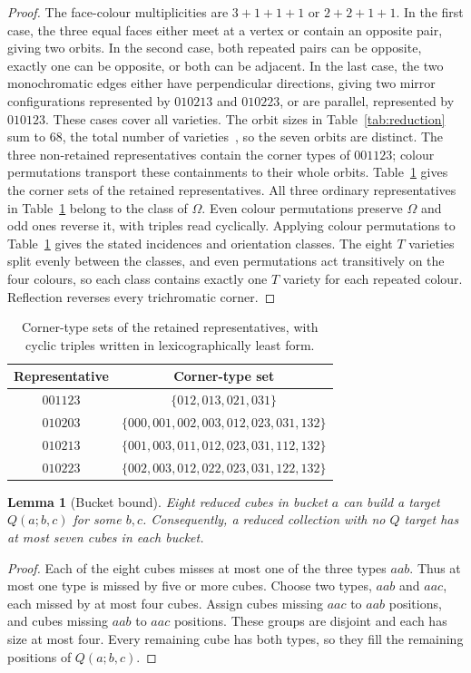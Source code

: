 \documentclass[11pt]{article}
\newtheorem{lemma}{Lemma}
\theoremstyle{remark}
\begin{document}
\begin{proof}
The face-colour multiplicities are $3+1+1+1$ or $2+2+1+1$.
In the first case, the three equal faces either meet at a vertex or contain
an opposite pair, giving two orbits. In the second case, both repeated
pairs can be opposite, exactly one can be opposite, or both can be adjacent.
In the last case, the two monochromatic edges either have perpendicular
directions, giving two mirror configurations represented by $010213$ and
$010223$, or are parallel, represented by $010123$. These cases cover all
varieties. The orbit sizes in Table~\ref{tab:reduction} sum to 68, the total
number of varieties~\cite{BES}, so the seven orbits are distinct.
The three non-retained representatives contain the corner types of $001123$;
colour permutations transport these containments to their whole orbits.
Table~\ref{tab:corners} gives the corner sets of the retained representatives.
All three ordinary representatives in Table~\ref{tab:corners} belong
to the class of $\Omega$. Even colour permutations preserve $\Omega$
and odd ones reverse it, with triples read cyclically. Applying colour
permutations to Table~\ref{tab:corners} gives the stated incidences and
orientation classes. The eight $T$ varieties split evenly between the
classes, and even permutations act transitively on the four colours, so
each class contains exactly one $T$ variety for each repeated colour.
Reflection reverses every trichromatic corner.
\end{proof}

\begin{table}[ht]
\centering
\begin{tabular}{cc}
\toprule
Representative & Corner-type set\\
\midrule
$001123$ & $\{012,013,021,031\}$\\
$010203$ & $\{000,001,002,003,012,023,031,132\}$\\
$010213$ & $\{001,003,011,012,023,031,112,132\}$\\
$010223$ & $\{002,003,012,022,023,031,122,132\}$\\
\bottomrule
\end{tabular}
\caption{Corner-type sets of the retained representatives, with cyclic
triples written in lexicographically least form.}
\label{tab:corners}
\end{table}

\begin{lemma}[Bucket bound]\label{lem:bucket}
Eight reduced cubes in bucket $a$ can build a target $Q(a;b,c)$ for some
$b,c$. Consequently, a reduced collection with no $Q$ target has at most
seven cubes in each bucket.
\end{lemma}
\begin{proof}
Each of the eight cubes misses at most one of the three types $aab$.
Thus at most one type is missed by five or more cubes. Choose two types,
$aab$ and $aac$, each missed by at most four cubes. Assign cubes missing
$aac$ to $aab$ positions, and cubes missing $aab$ to $aac$ positions.
These groups are disjoint and each has size at most four. Every remaining
cube has both types, so they fill the remaining positions of
$Q(a;b,c)$.
\end{proof}
\end{document}
